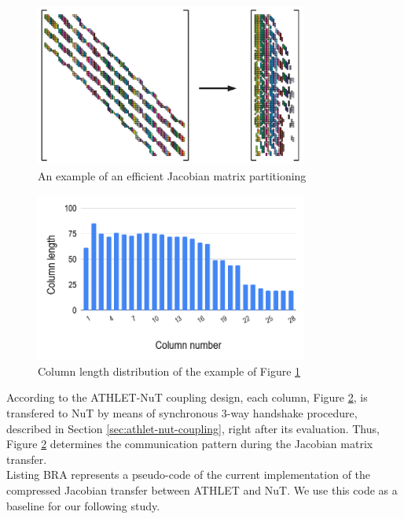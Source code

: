 \figpointer{\ref{fig:matrix-partitioning-example}}
\begin{figure}[htpb]
  \centering
  \includegraphics[width=0.8\textwidth]{figures/matrix-compression.png}
  \caption{An example of an efficient Jacobian matrix partitioning \cite{gebremedhin2005color}} \label{fig:matrix-partitioning-example}
\end{figure}


\begin{figure}[htpb]
  \centering
  \includegraphics[width=0.8\textwidth]{figures/matrix-compression-2.png}
  \caption{Column length distribution of the example of Figure \ref{fig:matrix-partitioning-example}} \label{fig:matrix-column-distribution}
\end{figure}


According to the ATHLET-NuT coupling design, each column, Figure \ref{fig:matrix-column-distribution}, is transfered to NuT by means of synchronous 3-way handshake procedure, described in Section \ref{sec:athlet-nut-coupling}, right after its evaluation. Thus, Figure \ref{fig:matrix-column-distribution} determines the communication pattern during the Jacobian matrix transfer.\\


Listing BRA represents a pseudo-code of the current implementation of the compressed Jacobian transfer between ATHLET and NuT. We use this code as a baseline for our following study.\\







